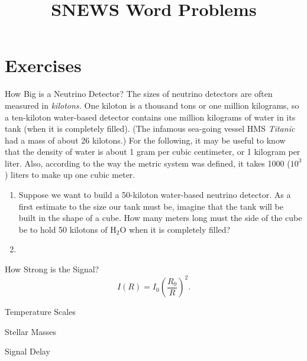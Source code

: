 \documentclass[12pt]{article}
\begin{document}
\title{SNEWS Word Problems}
\author{}
\date{}
\maketitle

\section{Exercises}

\begin{probdesc}{1}{How Big is a Neutrino Detector?}
The sizes of neutrino detectors are often measured in {\em kilotons.}
One kiloton is a thousand tons or one million kilograms, so a
ten-kiloton water-based detector contains one million kilograms of
water in its tank (when it is completely filled).  (The infamous
sea-going vessel HMS {\em Titanic} had a mass of about 26 kilotons.)
For the following, it may be useful to know that the density of water
is about 1 gram per cubic centimeter, or 1 kilogram per liter.  Also,
according to the way the metric system was defined, it takes 1000
($10^3$) liters to make up one cubic meter.

\begin{enumerate}
\item[(a)] Suppose we want to build a 50-kiloton water-based neutrino
  detector.  As a first estimate to the size our tank must be, imagine
  that the tank will be built in the shape of a cube.  How many meters
  long must the side of the cube be to hold 50 kilotons of H$_2$O when
  it is completely filled?

\item[(b)]
\end{enumerate}

\end{probdesc}

\begin{probdesc}{2}{How Strong is the Signal?}
\begin{equation}
I(R) = I_0 \left(\frac{R_0}{R}\right)^2.
\end{equation}
\end{probdesc}

\begin{probdesc}{3}{Temperature Scales}
\end{probdesc}

\begin{probdesc}{4}{Stellar Masses}
\end{probdesc}

\begin{probdesc}{5}{Signal Delay}
\end{probdesc}
\end{document}
